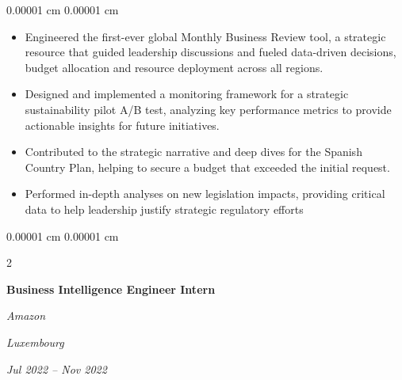 \documentclass[10pt, letterpaper]{article}
\newenvironment{highlights}{
    \begin{itemize}[
        topsep=0.05 cm,
        parsep=0.05 cm,
        partopsep=0pt,
        itemsep=0pt,
        leftmargin=0.4 cm + 10pt
    ]
}{
    \end{itemize}
} %
\newenvironment{onecolentry}{
    \begin{adjustwidth}{
         0.00001 cm
    }{
        0.00001 cm
    }
}{
    \end{adjustwidth}
} %
\newenvironment{twocolentry}[2][]{
    \onecolentry
    \def\secondColumn{#2}
    \setcolumnwidth{\fill, 4.5 cm}
    \begin{paracol}{2}
}{
    \switchcolumn \raggedleft \secondColumn
    \end{paracol}
    \endonecolentry
} %
\begin{document}
        \vspace{0.15 cm}
        \begin{onecolentry}
            \begin{highlights}
                \item Engineered the first-ever global Monthly Business Review tool, a strategic resource that guided leadership discussions and fueled data-driven decisions, budget allocation and resource deployment across all regions.
                \item Designed and implemented a monitoring framework for a strategic sustainability pilot A/B test, analyzing key performance metrics to provide actionable insights for future initiatives.
                \item Contributed to the strategic narrative and deep dives for the Spanish Country Plan, helping to secure a budget that exceeded the initial request.
                \item Performed in-depth analyses on new legislation impacts, providing critical data to help leadership justify strategic regulatory efforts
            \end{highlights}
        \end{onecolentry}


        \vspace{0.3 cm}

        \begin{twocolentry}{
        \textit{Luxembourg}\vspace{0 cm}    
            
        \textit{Jul 2022 – Nov 2022}}
            \textbf{Business Intelligence Engineer Intern}\vspace{0 cm}
            
            \textit{Amazon}
        \end{twocolentry}
\end{document}
